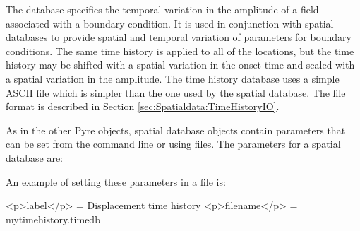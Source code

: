 The  database specifies the temporal variation in the
amplitude of a field associated with a boundary condition. It is used
in conjunction with spatial databases to provide spatial and temporal
variation of parameters for boundary conditions. The same time history
is applied to all of the locations, but the time history may be shifted
with a spatial variation in the onset time and scaled with a spatial
variation in the amplitude. The time history database uses a simple
ASCII file which is simpler than the one used by the  spatial
database. The file format is described in Section \vref{sec:Spatialdata:TimeHistoryIO}. 

As in the other Pyre objects, spatial database objects contain parameters
that can be set from the command line or using 
files. The parameters for a spatial database are:
\begin{inventory}
\end{inventory}
An example of setting these parameters in a  file is:
\begin{cfg}
<p>label</p> = Displacement time history
<p>filename</p> = mytimehistory.timedb
\end{cfg}

